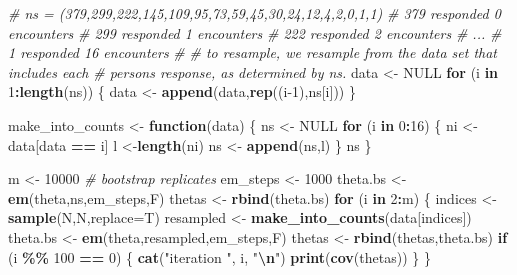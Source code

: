 \documentclass[
]{article}
\newenvironment{Shaded}{\begin{snugshade}}{\end{snugshade}}
\newcommand{\AttributeTok}[1]{\textcolor[rgb]{0.13,0.29,0.53}{#1}}
\newcommand{\CommentTok}[1]{\textcolor[rgb]{0.56,0.35,0.01}{\textit{#1}}}
\newcommand{\ConstantTok}[1]{\textcolor[rgb]{0.56,0.35,0.01}{#1}}
\newcommand{\ControlFlowTok}[1]{\textcolor[rgb]{0.13,0.29,0.53}{\textbf{#1}}}
\newcommand{\DecValTok}[1]{\textcolor[rgb]{0.00,0.00,0.81}{#1}}
\newcommand{\FunctionTok}[1]{\textcolor[rgb]{0.13,0.29,0.53}{\textbf{#1}}}
\newcommand{\NormalTok}[1]{#1}
\newcommand{\OtherTok}[1]{\textcolor[rgb]{0.56,0.35,0.01}{#1}}
\newcommand{\SpecialCharTok}[1]{\textcolor[rgb]{0.81,0.36,0.00}{\textbf{#1}}}
\newcommand{\StringTok}[1]{\textcolor[rgb]{0.31,0.60,0.02}{#1}}
\begin{document}
\begin{Shaded}
\begin{Highlighting}[]
\CommentTok{\# ns = (379,299,222,145,109,95,73,59,45,30,24,12,4,2,0,1,1)}
\CommentTok{\# 379 responded 0 encounters}
\CommentTok{\# 299 responded 1 encounters}
\CommentTok{\# 222 responded 2 encounters}
\CommentTok{\# ...}
\CommentTok{\# 1 responded 16 encounters}
\CommentTok{\#}
\CommentTok{\# to resample, we resample from the data set that includes each}
\CommentTok{\# persons response, as determined by ns.}
\NormalTok{data }\OtherTok{\textless{}{-}} \ConstantTok{NULL}
\ControlFlowTok{for}\NormalTok{ (i }\ControlFlowTok{in} \DecValTok{1}\SpecialCharTok{:}\FunctionTok{length}\NormalTok{(ns))}
\NormalTok{\{}
\NormalTok{  data }\OtherTok{\textless{}{-}} \FunctionTok{append}\NormalTok{(data,}\FunctionTok{rep}\NormalTok{((i}\DecValTok{{-}1}\NormalTok{),ns[i]))}
\NormalTok{\}}

\NormalTok{make\_into\_counts }\OtherTok{\textless{}{-}} \ControlFlowTok{function}\NormalTok{(data)}
\NormalTok{\{}
\NormalTok{  ns }\OtherTok{\textless{}{-}} \ConstantTok{NULL}
  \ControlFlowTok{for}\NormalTok{ (i }\ControlFlowTok{in} \DecValTok{0}\SpecialCharTok{:}\DecValTok{16}\NormalTok{)}
\NormalTok{  \{}
\NormalTok{    ni }\OtherTok{\textless{}{-}}\NormalTok{ data[data }\SpecialCharTok{==}\NormalTok{ i]}
\NormalTok{    l }\OtherTok{\textless{}{-}}\FunctionTok{length}\NormalTok{(ni)}
\NormalTok{    ns }\OtherTok{\textless{}{-}} \FunctionTok{append}\NormalTok{(ns,l)}
\NormalTok{  \}}
\NormalTok{  ns}
\NormalTok{\}}

\NormalTok{m }\OtherTok{\textless{}{-}} \DecValTok{10000} \CommentTok{\# bootstrap replicates}
\NormalTok{em\_steps }\OtherTok{\textless{}{-}} \DecValTok{1000}
\NormalTok{theta.bs }\OtherTok{\textless{}{-}} \FunctionTok{em}\NormalTok{(theta,ns,em\_steps,F)}
\NormalTok{thetas }\OtherTok{\textless{}{-}} \FunctionTok{rbind}\NormalTok{(theta.bs)}
\ControlFlowTok{for}\NormalTok{ (i }\ControlFlowTok{in} \DecValTok{2}\SpecialCharTok{:}\NormalTok{m)}
\NormalTok{\{}
\NormalTok{  indices }\OtherTok{\textless{}{-}} \FunctionTok{sample}\NormalTok{(N,N,}\AttributeTok{replace=}\NormalTok{T)}
\NormalTok{  resampled }\OtherTok{\textless{}{-}} \FunctionTok{make\_into\_counts}\NormalTok{(data[indices])}
\NormalTok{  theta.bs }\OtherTok{\textless{}{-}} \FunctionTok{em}\NormalTok{(theta,resampled,em\_steps,F)}
\NormalTok{  thetas }\OtherTok{\textless{}{-}} \FunctionTok{rbind}\NormalTok{(thetas,theta.bs)}
  \ControlFlowTok{if}\NormalTok{ (i }\SpecialCharTok{\%\%} \DecValTok{100} \SpecialCharTok{==} \DecValTok{0}\NormalTok{)}
\NormalTok{  \{}
    \FunctionTok{cat}\NormalTok{(}\StringTok{"iteration "}\NormalTok{, i, }\StringTok{"}\SpecialCharTok{\textbackslash{}n}\StringTok{"}\NormalTok{)}
    \FunctionTok{print}\NormalTok{(}\FunctionTok{cov}\NormalTok{(thetas))}
\NormalTok{  \}}
\NormalTok{\}}
\end{Highlighting}
\end{Shaded}
\end{document}
